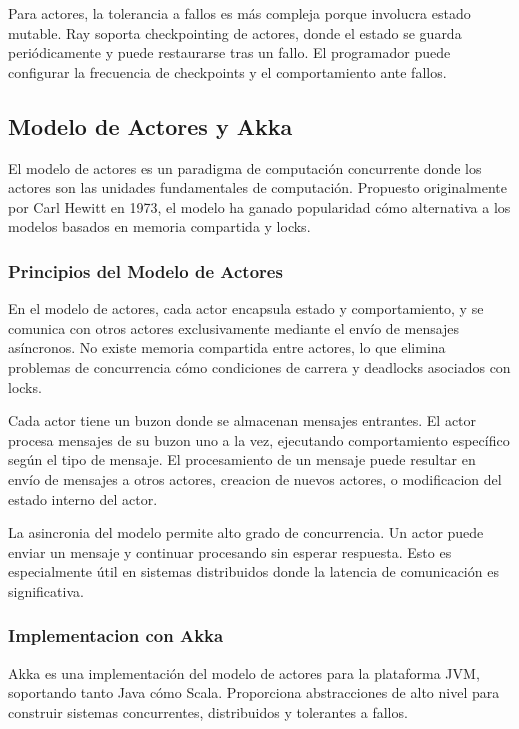 \documentclass[12pt,a4paper,twoside]{book}
\begin{document}
Para actores, la tolerancia a fallos es más compleja porque involucra estado mutable. Ray soporta checkpointing de actores, donde el estado se guarda periódicamente y puede restaurarse tras un fallo. El programador puede configurar la frecuencia de checkpoints y el comportamiento ante fallos.

\subsection{Modelo de Actores y Akka}

El modelo de actores es un paradigma de computación concurrente donde los actores son las unidades fundamentales de computación. Propuesto originalmente por Carl Hewitt en 1973, el modelo ha ganado popularidad cómo alternativa a los modelos basados en memoria compartida y locks.

\subsubsection{Principios del Modelo de Actores}

En el modelo de actores, cada actor encapsula estado y comportamiento, y se comunica con otros actores exclusivamente mediante el envío de mensajes asíncronos. No existe memoria compartida entre actores, lo que elimina problemas de concurrencia cómo condiciones de carrera y deadlocks asociados con locks.

Cada actor tiene un buzon donde se almacenan mensajes entrantes. El actor procesa mensajes de su buzon uno a la vez, ejecutando comportamiento específico según el tipo de mensaje. El procesamiento de un mensaje puede resultar en envío de mensajes a otros actores, creacion de nuevos actores, o modificacion del estado interno del actor.

La asincronia del modelo permite alto grado de concurrencia. Un actor puede enviar un mensaje y continuar procesando sin esperar respuesta. Esto es especialmente útil en sistemas distribuidos donde la latencia de comunicación es significativa.

\subsubsection{Implementacion con Akka}

Akka es una implementación del modelo de actores para la plataforma JVM, soportando tanto Java cómo Scala. Proporciona abstracciones de alto nivel para construir sistemas concurrentes, distribuidos y tolerantes a fallos.
\end{document}
